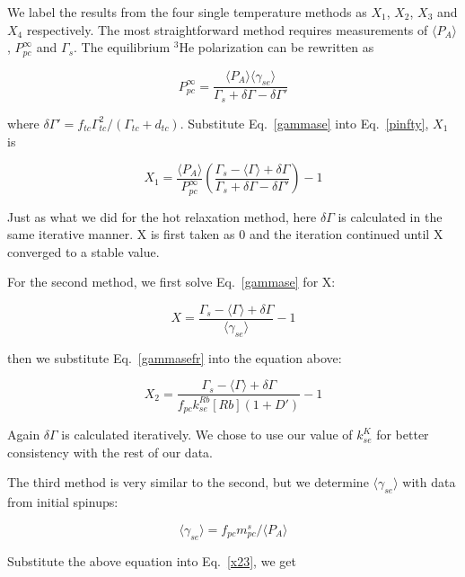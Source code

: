 We label the results from the four single temperature methods as $X_1$, $X_2$, $X_3$ and $X_4$ respectively. The most straightforward method requires measurements of $\langle P_A\rangle$, $P_{pc}^\infty$ and $\Gamma_s$. The equilibrium $^3$He polarization can be rewritten as

\begin{equation}\label{pinfty}
P_{pc}^\infty=\frac{\langle P_A\rangle\langle\gamma_{se}\rangle}{\Gamma_s+\delta\Gamma-\delta\Gamma'}
\end{equation}

where $\delta\Gamma'=f_{tc}\Gamma_{tc}^2/(\Gamma_{tc}+d_{tc}).$ Substitute Eq.~\ref{gammase} into Eq.~\ref{pinfty}, $X_1$ is

\begin{equation}
X_1=\frac{\langle P_A\rangle}{P_{pc}^\infty}\left(\frac{\Gamma_s-\langle\Gamma\rangle+\delta\Gamma}{\Gamma_s+\delta\Gamma-\delta\Gamma'}\right)-1
\end{equation}

Just as what we did for the hot relaxation method, here $\delta\Gamma$ is calculated in the same iterative manner. X is first taken as 0 and the iteration continued until X converged to a stable value.

For the second method, we first solve Eq.~\ref{gammase} for X:

\begin{equation}\label{x23}
X=\frac{\Gamma_s-\langle\Gamma\rangle+\delta\Gamma}{\langle\gamma_{se}\rangle}-1
\end{equation}

then we substitute Eq.~\ref{gammasefr} into the equation above:

\begin{equation}
X_2=\frac{\Gamma_s-\langle\Gamma\rangle+\delta\Gamma}{f_{pc}k_{se}^{Rb}[Rb](1+D')}-1
\end{equation}

Again $\delta\Gamma$ is calculated iteratively. We chose to use our value of $k_{se}^{K}$ for better consistency with the rest of our data.

The third method is very similar to the second, but we determine $\langle\gamma_{se}\rangle$ with data from initial spinups:

\begin{equation}
\langle\gamma_{se}\rangle=f_{pc}m_{pc}^{s}/\langle P_A\rangle
\end{equation}

Substitute the above equation into Eq.~\ref{x23}, we get

